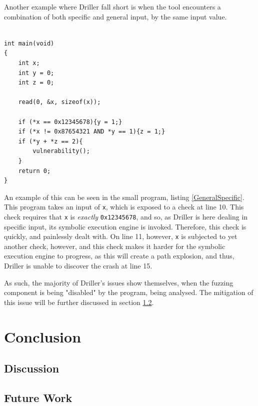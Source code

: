 \documentclass[a4paper]{article}
\newcommand{\tit}[1]{\textit{#1}}
\newcommand{\ttt}[1]{\texttt{#1}}
\begin{document}
Another example where Driller fall short is when the tool encounters a combination of both specific and general input, by the same input value. 
\newpage
\begin{lstlisting}[caption=An example of Driller being outmanoeuvred by specific and general input,
label=GeneralSpecific, captionpos=b]

int main(void)
{
    int x;
    int y = 0;
    int z = 0;

    read(0, &x, sizeof(x));
    
    if (*x == 0x12345678){y = 1;}
    if (*x != 0x87654321 AND *y == 1){z = 1;}
    if (*y + *z == 2){
        vulnerability();
    }
    return 0;
}
\end{lstlisting}
An example of this can be seen in the small program, listing \ref{GeneralSpecific}. This program takes an input of \ttt{x}, which is exposed to a check at line 10. This check requires that \ttt{x} is \tit{exactly} \ttt{0x12345678}, and so, as Driller is here dealing in specific input, its symbolic execution engine is invoked. Therefore, this check is quickly, and painlessly dealt with. On line 11, however, \ttt{x} is subjected to yet another check, however, and this check makes it harder for the symbolic execution engine to progress, as this will create a path explosion, and thus, Driller is unable to discover the crash at line 15.

As such, the majority of Driller's issues show themselves, when the fuzzing component is being "disabled" by the program, being analysed. The mitigation of this issue will be further discussed in section \ref{sec:FutureWork}.
\section{Conclusion}
\label{sec:Conclusion}

\subsection{Discussion}
\label{sec:Discussion}

\subsection{Future Work}
\label{sec:FutureWork}
\end{document}
